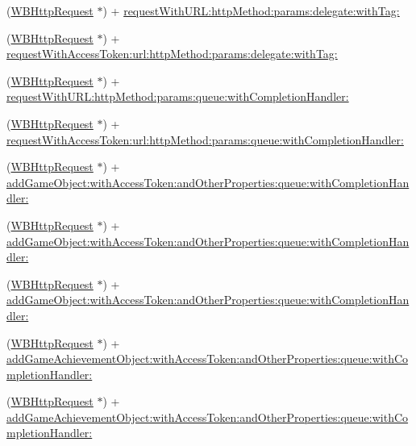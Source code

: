 \begin{DoxyCompactItemize}
(\mbox{\hyperlink{interface_w_b_http_request}{W\+B\+Http\+Request}} $\ast$) + \mbox{\hyperlink{interface_w_b_http_request_a9deb407d01b6907f530279cecaa06f98}{request\+With\+U\+R\+L\+:http\+Method\+:params\+:delegate\+:with\+Tag\+:}}
\item 
(\mbox{\hyperlink{interface_w_b_http_request}{W\+B\+Http\+Request}} $\ast$) + \mbox{\hyperlink{interface_w_b_http_request_a287736c75767a8e2c0ca578a53e4e305}{request\+With\+Access\+Token\+:url\+:http\+Method\+:params\+:delegate\+:with\+Tag\+:}}
\item 
(\mbox{\hyperlink{interface_w_b_http_request}{W\+B\+Http\+Request}} $\ast$) + \mbox{\hyperlink{interface_w_b_http_request_a6cb01a6097164bb37dc91517c1609a6e}{request\+With\+U\+R\+L\+:http\+Method\+:params\+:queue\+:with\+Completion\+Handler\+:}}
\item 
(\mbox{\hyperlink{interface_w_b_http_request}{W\+B\+Http\+Request}} $\ast$) + \mbox{\hyperlink{interface_w_b_http_request_a9c704ca2a1f1c6e372b4695295bb7bc2}{request\+With\+Access\+Token\+:url\+:http\+Method\+:params\+:queue\+:with\+Completion\+Handler\+:}}
\item 
(\mbox{\hyperlink{interface_w_b_http_request}{W\+B\+Http\+Request}} $\ast$) + \mbox{\hyperlink{interface_w_b_http_request_ae85dddcb52426ccf3105aecd613c25f1}{add\+Game\+Object\+:with\+Access\+Token\+:and\+Other\+Properties\+:queue\+:with\+Completion\+Handler\+:}}
\item 
(\mbox{\hyperlink{interface_w_b_http_request}{W\+B\+Http\+Request}} $\ast$) + \mbox{\hyperlink{interface_w_b_http_request_ae85dddcb52426ccf3105aecd613c25f1}{add\+Game\+Object\+:with\+Access\+Token\+:and\+Other\+Properties\+:queue\+:with\+Completion\+Handler\+:}}
\item 
(\mbox{\hyperlink{interface_w_b_http_request}{W\+B\+Http\+Request}} $\ast$) + \mbox{\hyperlink{interface_w_b_http_request_ae85dddcb52426ccf3105aecd613c25f1}{add\+Game\+Object\+:with\+Access\+Token\+:and\+Other\+Properties\+:queue\+:with\+Completion\+Handler\+:}}
\item 
(\mbox{\hyperlink{interface_w_b_http_request}{W\+B\+Http\+Request}} $\ast$) + \mbox{\hyperlink{interface_w_b_http_request_a3e9ccee69346b4924f899ce4127e6c24}{add\+Game\+Achievement\+Object\+:with\+Access\+Token\+:and\+Other\+Properties\+:queue\+:with\+Completion\+Handler\+:}}
\item 
(\mbox{\hyperlink{interface_w_b_http_request}{W\+B\+Http\+Request}} $\ast$) + \mbox{\hyperlink{interface_w_b_http_request_a3e9ccee69346b4924f899ce4127e6c24}{add\+Game\+Achievement\+Object\+:with\+Access\+Token\+:and\+Other\+Properties\+:queue\+:with\+Completion\+Handler\+:}}

\end{DoxyCompactItemize}
